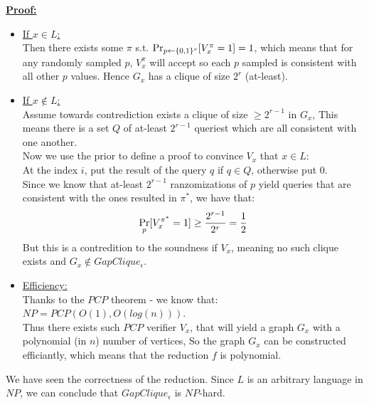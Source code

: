 \underline{\textbf{Proof:}}\\
\begin{itemize}
    \item \underline{If $x\in L$:}\\
    Then there exists some $\pi$ s.t. $\operatorname*{Pr}_{p\leftarrow\{0,1\}^r}[V^\pi_x=1]=1$,
    which means that for any randomly sampled $p$, $V_x^\pi$ will accept so
    each $p$ sampled is consistent with all other $p$ values. Hence $G_x$ has a clique of
    size $2^r$ (at-least).\\
    \item \underline{If $x\notin L$:}\\
    Assume towards contrediction exists a clique of size $\geq 2^{r-1}$ in $G_x$,
    This means there is a set $Q$ of at-least $2^{r-1}$ queriest which are all consistent 
    with one another.\\
    Now we use the prior to define a proof to convince $V_x$ that $x\in L$:\\
    At the index $i$, put the result of the query $q$ if $q\in Q$, otherwise put $0$.\\
    Since we know that at-least $2^{r-1}$ ranzomizations of $p$ yield
    queries that are consistent with the ones resulted in $\pi^*$, we have that:
    \[
        \operatorname*{Pr}_p[V_x^{\pi^*}=1]\geq \frac{2^{r-1}}{2^r}=\frac{1}{2}
    \]
    But this is a contredition to the soundness if $V_x$,
    meaning no such clique exists and $G_x\notin GapClique_\epsilon$.\\
    \item \underline{Efficiency:}\\
    Thanks to the $PCP$ theorem - we know that: $NP=PCP(O(1),O(log(n)))$.\\
    Thus there exists such $PCP$ verifier $V_x$, that will yield a graph $G_x$ with
    a polynomial (in $n$) number of vertices, So the graph $G_x$
    can be constructed efficiantly, which means that the reduction $f$ is polynomial.
\end{itemize}
We have seen the correctness of the reduction. Since $L$ is an arbitrary language in $NP$,
we can conclude that $GapClique_\epsilon$ is $NP$-hard.